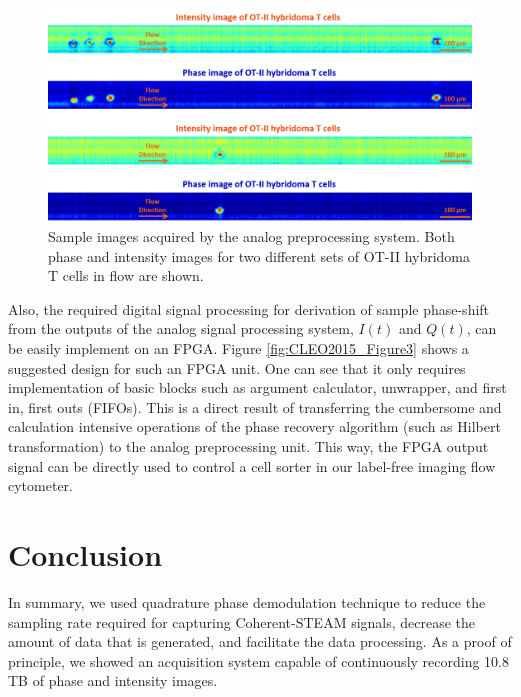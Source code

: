 \begin{figure}[htb!]
\centering
\includegraphics[scale=0.6]{CLEO2015/Figure4.png}
\caption{Sample images acquired by the analog preprocessing system. Both phase and intensity images for two different sets of OT-II hybridoma T cells in flow are shown.}
\label{fig:CLEO2015_Figure4}
\end{figure}  

Also, the required digital signal processing for derivation of sample phase-shift from the outputs of the analog signal processing system, $I(t)$ and $Q(t)$, can be easily implement on an FPGA. Figure \ref{fig:CLEO2015_Figure3} shows a suggested design for such an FPGA unit. One can see that it only requires implementation of basic blocks such as argument calculator, unwrapper, and first in, first outs (FIFOs). This is a direct result of transferring the cumbersome and calculation intensive operations of the phase recovery algorithm (such as Hilbert transformation) to the analog preprocessing unit. This way, the FPGA output signal can be directly used to control a cell sorter in our label-free imaging flow cytometer. 

\section{Conclusion}

In summary, we used quadrature phase demodulation technique to reduce the sampling rate required for capturing Coherent-STEAM signals, decrease the amount of data that is generated, and facilitate the data processing. As a proof of principle, we showed an acquisition system capable of continuously recording 10.8 TB of phase and intensity images. 